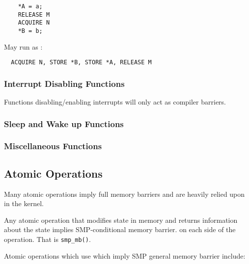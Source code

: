 \documentclass{article}
\begin{document}
\begin{lstlisting}  
	*A = a;
	RELEASE M
	ACQUIRE N
	*B = b;
\end{lstlisting}

May run as :


\begin{lstlisting}
  ACQUIRE N, STORE *B, STORE *A, RELEASE M
\end{lstlisting}



\subsubsection{Interrupt Disabling Functions}

Functions disabling/enabling interrupts will only act as compiler
barriers. 

\subsubsection{Sleep and Wake up Functions}



\subsubsection{Miscellaneous Functions}



\subsection{Atomic Operations}

Many atomic operations imply full memory barriers and are heavily
relied upon in the kernel.

Any atomic operation that modifies state in memory and returns
information about the state implies SMP-conditional memory barrier.
on each side of the operation. That is \lstinline{smp_mb()}.

Atomic operations which use which imply SMP general memory barrier
include:
\end{document}
